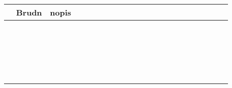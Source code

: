 \documentclass[10pt]{article}
\begin{document}
\begin{center}
\begin{tabular}{|c|c|c|c|c|c|c|c|c|c|c|c|c|c|c|c|c|c|c|c|c|c|}
\hline
 & Brudn & nopis &  &  &  &  &  &  &  &  &  &  &  &  &  &  &  &  &  &  &  \\
\hline
 &  &  &  &  &  &  &  &  &  &  &  &  &  &  &  &  &  &  &  &  &  \\
\hline
 &  &  &  &  &  &  &  &  &  &  &  &  &  &  &  &  &  &  &  &  &  \\
\hline
 &  &  &  &  &  &  &  &  &  &  &  &  &  &  &  &  &  &  &  &  &  \\
\hline
 &  &  &  &  &  &  &  &  &  &  &  &  &  &  &  &  &  &  &  &  &  \\
\hline
 &  &  &  &  &  &  &  &  &  &  &  &  &  &  &  &  &  &  &  &  &  \\
\hline
 &  &  &  &  &  &  &  &  &  &  &  &  &  &  &  &  &  &  &  &  &  \\
\hline
 &  &  &  &  &  &  &  &  &  &  &  &  &  &  &  &  &  &  &  &  &  \\
\hline
 &  &  &  &  &  &  &  &  &  &  &  &  &  &  &  &  &  &  &  &  &  \\
\hline
 &  &  &  &  &  &  &  &  &  &  &  &  &  &  &  &  &  &  &  &  &  \\
\hline
 &  &  &  &  &  &  &  &  &  &  &  &  &  &  &  &  &  &  &  &  &  \\
\hline
 &  &  &  &  &  &  &  &  &  &  &  &  &  &  &  &  &  &  &  &  &  \\
\hline
 &  &  &  &  &  &  &  &  &  &  &  &  &  &  &  &  &  &  &  &  &  \\
\hline
 &  &  &  &  &  &  &  &  &  &  &  &  &  &  &  &  &  &  &  &  &  \\
\hline
 &  &  &  &  &  &  &  &  &  &  &  &  &  &  &  &  &  &  &  &  &  \\
\hline
 &  &  &  &  &  &  &  &  &  &  &  &  &  &  &  &  &  &  &  &  &  \\
\hline
 &  &  &  &  &  &  &  &  &  &  &  &  &  &  &  &  &  &  &  &  &  \\
\hline
 &  &  &  &  &  &  &  &  &  &  &  &  &  &  &  &  &  &  &  &  &  \\
\hline
 &  &  &  &  &  &  &  &  &  &  &  &  &  &  &  &  &  &  &  &  &  \\
\hline
 &  &  &  &  &  &  &  &  &  &  &  &  &  &  &  &  &  &  &  &  &  \\
\hline
 &  &  &  &  &  &  &  &  &  &  &  &  &  &  &  &  &  &  &  &  &  \\
\hline
 &  &  &  &  &  &  &  &  &  &  &  &  &  &  &  &  &  &  &  &  &  \\

\end{tabular}
\end{center}
\end{document}
